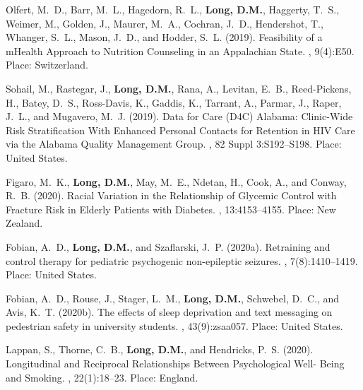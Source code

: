 \begin{thebibliography}{}
Olfert, M.~D., Barr, M.~L., Hagedorn, R.~L., \textbf{Long, D.M.}, Haggerty, T.~S.,
  Weimer, M., Golden, J., Maurer, M.~A., Cochran, J.~D., Hendershot, T.,
  Whanger, S.~L., Mason, J.~D., and Hodder, S.~L. (2019).
\newblock Feasibility of a {mHealth} {Approach} to {Nutrition} {Counseling} in
  an {Appalachian} {State}.
, 9(4):E50.
\newblock Place: Switzerland.

Sohail, M., Rastegar, J., \textbf{Long, D.M.}, Rana, A., Levitan, E.~B., Reed-Pickens, H.,
  Batey, D.~S., Ross-Davis, K., Gaddis, K., Tarrant, A., Parmar, J., Raper,
  J.~L., and Mugavero, M.~J. (2019).
\newblock Data for {Care} ({D4C}) {Alabama}: {Clinic}-{Wide} {Risk}
  {Stratification} {With} {Enhanced} {Personal} {Contacts} for {Retention} in
  {HIV} {Care} via the {Alabama} {Quality} {Management} {Group}.
, 82
  Suppl 3:S192--S198.
\newblock Place: United States.


Figaro, M.~K., \textbf{Long, D.M.}, May, M.~E., Ndetan, H., Cook, A., and Conway, R.~B.
  (2020).
\newblock Racial {Variation} in the {Relationship} of {Glycemic} {Control} with
  {Fracture} {Risk} in {Elderly} {Patients} with {Diabetes}.
,
  13:4153--4155.
\newblock Place: New Zealand.

Fobian, A.~D., \textbf{Long, D.M.}, and Szaflarski, J.~P. (2020a).
\newblock Retraining and control therapy for pediatric psychogenic
  non-epileptic seizures.
,
  7(8):1410--1419.
\newblock Place: United States.

Fobian, A.~D., Rouse, J., Stager, L.~M., \textbf{Long, D.M.}, Schwebel, D.~C., and Avis,
  K.~T. (2020b).
\newblock The effects of sleep deprivation and text messaging on pedestrian
  safety in university students.
, 43(9):zsaa057.
\newblock Place: United States.

Lappan, S., Thorne, C.~B., \textbf{Long, D.M.}, and Hendricks, P.~S. (2020).
\newblock Longitudinal and {Reciprocal} {Relationships} {Between}
  {Psychological} {Well}- {Being} and {Smoking}.
, 22(1):18--23.
\newblock Place: England.


\end{thebibliography}
